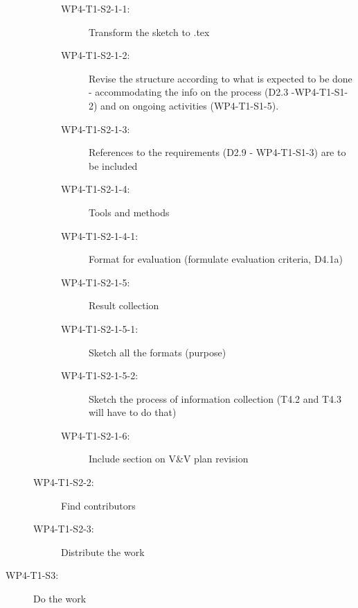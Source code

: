 \begin{description}
\begin{description}
\begin{description}
    \item[WP4-T1-S2-1-1:] Transform the sketch to .tex
    \item[WP4-T1-S2-1-2:] Revise the structure according to what is
      expected to be done - accommodating the info on the process (D2.3
      -WP4-T1-S1-2) and on ongoing activities  (WP4-T1-S1-5). 
    \item[WP4-T1-S2-1-3:] References to the requirements (D2.9 - WP4-T1-S1-3) are to be included
    \item[WP4-T1-S2-1-4:] Tools and methods
    \item[WP4-T1-S2-1-4-1:] Format for evaluation (formulate evaluation criteria, D4.1a)
    \item[WP4-T1-S2-1-5:] Result collection
    \item[WP4-T1-S2-1-5-1:] Sketch all the formats (purpose)
    \item[WP4-T1-S2-1-5-2:] Sketch the process of information collection
      (T4.2 and T4.3 will have to do that) 
    \item[WP4-T1-S2-1-6:] Include section on V\&V plan revision
    \end{description}
  \item[WP4-T1-S2-2:] Find contributors
  \item[WP4-T1-S2-3:] Distribute the work
  \end{description}
\item[WP4-T1-S3:]  Do the work
\end{description}  

